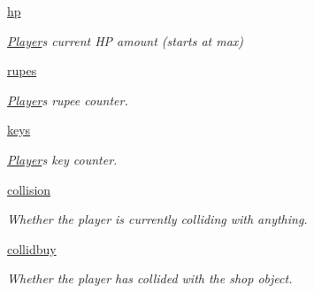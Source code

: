 \begin{DoxyCompactItemize}
\hyperlink{classactor_1_1player_1_1_player_ae153752032a484c8f84d11a3bd4ad922}{hp}
\begin{DoxyCompactList}\small\item\em \hyperlink{classactor_1_1player_1_1_player}{Player}\textquotesingle{}s current HP amount (starts at max) \end{DoxyCompactList}\item 
\mbox{\label{classactor_1_1player_1_1_player_aafe402d4ccb42214e7afa642a97a91ee}} 
\hyperlink{classactor_1_1player_1_1_player_aafe402d4ccb42214e7afa642a97a91ee}{rupes}
\begin{DoxyCompactList}\small\item\em \hyperlink{classactor_1_1player_1_1_player}{Player}\textquotesingle{}s rupee counter. \end{DoxyCompactList}\item 
\mbox{\label{classactor_1_1player_1_1_player_a2be3c96f039bbc8e535f2bc2a9379b75}} 
\hyperlink{classactor_1_1player_1_1_player_a2be3c96f039bbc8e535f2bc2a9379b75}{keys}
\begin{DoxyCompactList}\small\item\em \hyperlink{classactor_1_1player_1_1_player}{Player}\textquotesingle{}s key counter. \end{DoxyCompactList}\item 
\mbox{\label{classactor_1_1player_1_1_player_a2d44111bc500754466a7cc60f560a3b1}} 
\hyperlink{classactor_1_1player_1_1_player_a2d44111bc500754466a7cc60f560a3b1}{collision}
\begin{DoxyCompactList}\small\item\em Whether the player is currently colliding with anything. \end{DoxyCompactList}\item 
\mbox{\label{classactor_1_1player_1_1_player_ae7fd956a4af73cb7079ebac7fd02c500}} 
\hyperlink{classactor_1_1player_1_1_player_ae7fd956a4af73cb7079ebac7fd02c500}{collidbuy}
\begin{DoxyCompactList}\small\item\em Whether the player has collided with the shop object. \end{DoxyCompactList}\item 
\mbox{\label{classactor_1_1player_1_1_player_ad9f2b3abde9b91875f4840fed4f64da2}} 

\end{DoxyCompactItemize}
